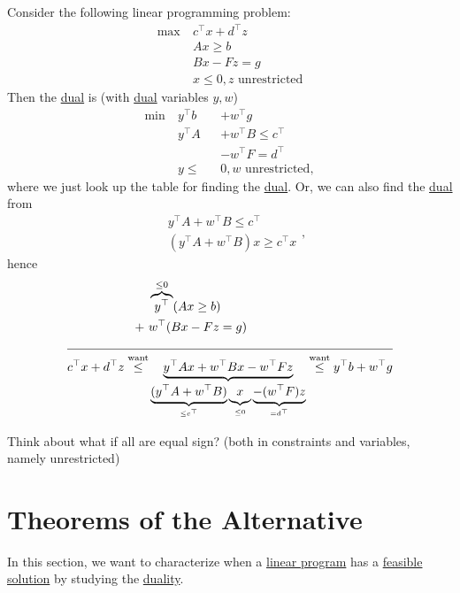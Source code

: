 \begin{eg}
	Consider the following linear programming problem:
	\[
		\begin{aligned}
			\max~ & c^{\top}x+d^{\top}z            \\
			      & Ax\geq b                       \\
			      & Bx - Fz = g                    \\
			      & x\leq 0, z\text{ unrestricted}
		\end{aligned}
	\]
	Then the \hyperref[def:dual]{dual} is (with \hyperref[def:dual]{dual} variables \(y, w\))
	\[
		\begin{alignedat}{3}
			\min~ & y^{\top}b   &&+w^{\top}g            \\
			& y^{\top}A  &&+w^{\top}B  \leq c^{\top} \\
			& &&-w^{\top}F = d^{\top}    \\
			& y\leq &&0, w \text{ unrestricted},
		\end{alignedat}
	\]
	where we just look up the table for finding the \hyperref[def:dual]{dual}. Or, we can also find the \hyperref[def:dual]{dual} from
	\[
		\begin{split}
			&y^{\top} A + w^{\top} B\leq c^{\top}\\
			&(y^{\top} A+w^{\top} B)x\geq c^{\top} x
		\end{split},
	\]
	hence
	\[
		\begin{split}
			&\overbrace{y^{\top}}^{\leq 0}(Ax\geq b)\\
			+\ &w^{\top}(Bx - Fz = g)\\
			\cline{1-2}
			c^{\top}x + d^{\top}z\overset{\text{want}}{\leq}&\underbrace{y^{\top}Ax + w^{\top}Bx - w^{\top} Fz}_{\underbrace{(y^{\top} A + w^{\top} B)}_{\leq c^{\top}}\underbrace{\vphantom{y^{\top}A}x}_{\leq 0} \underbrace{- (w^{\top} F)z}_{=d^{\top}}} \overset{\text{want}}{\leq} y^{\top}b+w^{\top}g
		\end{split}
	\]
\end{eg}
\begin{remark}
	Think about what if all are equal sign? (both in constraints and variables, namely unrestricted)
\end{remark}

\section{Theorems of the Alternative}
In this section, we want to characterize when a \hyperref[def:general-linear-programming-problem]{linear program} has a \hyperref[def:feasible-solution]{feasible solution} by studying the \hyperref[def:dual]{duality}.

